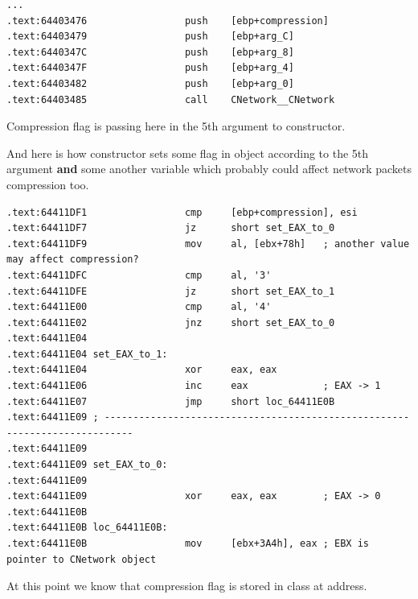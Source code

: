 \begin{lstlisting}
...
.text:64403476                 push    [ebp+compression]
.text:64403479                 push    [ebp+arg_C]
.text:6440347C                 push    [ebp+arg_8]
.text:6440347F                 push    [ebp+arg_4]
.text:64403482                 push    [ebp+arg_0]
.text:64403485                 call    CNetwork__CNetwork
\end{lstlisting}

{Compression flag is passing here in the 5th argument to  constructor.}

{And here is how  constructor sets some flag in  object according to the 5th argument \textbf{and}
some another variable which probably could affect network packets compression too.}

\begin{lstlisting}
.text:64411DF1                 cmp     [ebp+compression], esi
.text:64411DF7                 jz      short set_EAX_to_0
.text:64411DF9                 mov     al, [ebx+78h]   ; another value may affect compression?
.text:64411DFC                 cmp     al, '3'
.text:64411DFE                 jz      short set_EAX_to_1
.text:64411E00                 cmp     al, '4'
.text:64411E02                 jnz     short set_EAX_to_0
.text:64411E04
.text:64411E04 set_EAX_to_1:
.text:64411E04                 xor     eax, eax
.text:64411E06                 inc     eax             ; EAX -> 1
.text:64411E07                 jmp     short loc_64411E0B
.text:64411E09 ; ---------------------------------------------------------------------------
.text:64411E09
.text:64411E09 set_EAX_to_0:
.text:64411E09
.text:64411E09                 xor     eax, eax        ; EAX -> 0
.text:64411E0B
.text:64411E0B loc_64411E0B:
.text:64411E0B                 mov     [ebx+3A4h], eax ; EBX is pointer to CNetwork object
\end{lstlisting}

{At this point we know that compression flag is stored in  class at  address.}


